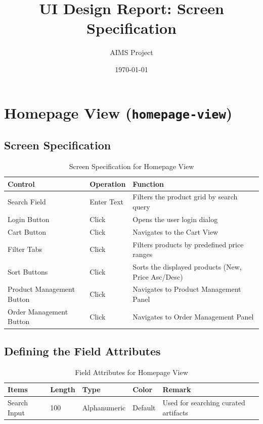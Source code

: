 \documentclass{article}
\title{UI Design Report: Screen Specification}
\author{AIMS Project}
\date{\today}
\begin{document}
\maketitle

\section{Homepage View (\texttt{homepage-view})}
\subsection{Screen Specification}
\begin{table}[h!]
\centering
\begin{tabularx}{\textwidth}{|l|l|X|}
\hline
\textbf{Control} & \textbf{Operation} & \textbf{Function} \\
\hline
Search Field & Enter Text & Filters the product grid by search query \\
\hline
Login Button & Click & Opens the user login dialog \\
\hline
Cart Button & Click & Navigates to the Cart View \\
\hline
Filter Tabs & Click & Filters products by predefined price ranges \\
\hline
Sort Buttons & Click & Sorts the displayed products (New, Price Asc/Desc) \\
\hline
Product Management Button & Click & Navigates to Product Management Panel \\
\hline
Order Management Button & Click & Navigates to Order Management Panel \\
\hline
\end{tabularx}
\caption{Screen Specification for Homepage View}
\end{table}

\subsection{Defining the Field Attributes}
\begin{table}[h!]
\centering
\begin{tabularx}{\textwidth}{|l|l|l|l|X|}
\hline
\textbf{Items} & \textbf{Length} & \textbf{Type} & \textbf{Color} & \textbf{Remark} \\
\hline
Search Input & 100 & Alphanumeric & Default & Used for searching curated artifacts \\
\hline
\end{tabularx}
\caption{Field Attributes for Homepage View}
\end{table}
\end{document}

